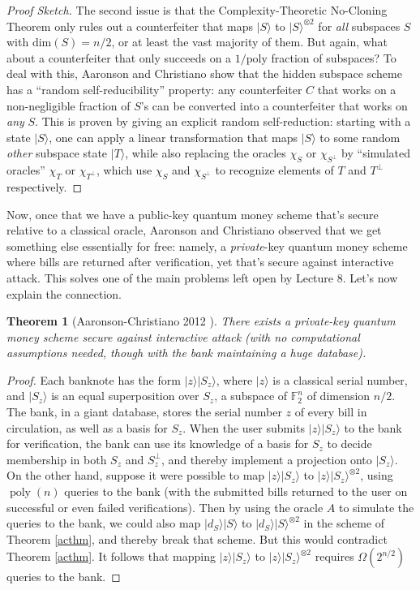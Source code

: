 \documentclass[12pt]{report}
\theoremstyle{plain}
\newtheorem{theorem}{Theorem}[section]
\theoremstyle{definition}
\newcommand{\poly}{\operatorname{poly}}
\renewcommand{\ket}[1]{|#1\rangle}
\begin{document}
\begin{proof}[Proof Sketch]
The second issue is that the Complexity-Theoretic No-Cloning Theorem only rules out a counterfeiter that maps $\ket{S}$ to $\ket{S}^{\otimes 2}$ for {\em all} subspaces $S$ with $\text{dim}(S) = n/2$, or at least the vast majority of them.  But again, what about a counterfeiter that only succeeds on a $1/\text{poly}$ fraction of subspaces?  To deal with this, Aaronson and Christiano show that the hidden subspace scheme has a ``random self-reducibility'' property: any counterfeiter $C$ that works on a non-negligible fraction of $S$'s can be converted into a counterfeiter that works on {\em any} $S$.  This is proven by giving an explicit random self-reduction: starting with a state $\ket{S}$, one can apply a linear transformation that maps $\ket{S}$ to some random {\em other} subspace state $\ket{T}$, while also replacing the oracles $\chi_S$ or $\chi_{S^\perp}$ by ``simulated oracles'' $\chi_T$ or $\chi_{T^\perp}$, which use $\chi_S$ and $\chi_{S^\perp}$ to recognize elements of $T$ and $T^{\perp}$ respectively.
\end{proof}

Now, once that we have a public-key quantum money scheme that's secure relative to a classical oracle, Aaronson and Christiano \cite{achristiano} observed that we get something else essentially for free: namely, a {\em private}-key quantum money scheme where bills are returned after verification, yet that's secure against interactive attack.  This solves one of the main problems left open by Lecture 8.  Let's now explain the connection.

\begin{theorem}[Aaronson-Christiano 2012 \cite{achristiano}]
There exists a private-key quantum money scheme secure against interactive attack (with no computational assumptions needed, though with the bank maintaining a huge database).
\end{theorem}
\begin{proof}
Each banknote has the form $\ket{z}\ket{S_z}$, where $\ket{z}$ is a classical serial number, and $\ket{S_z}$ is an equal superposition over $S_z$, a subspace of $\mathbb{F}_2^n$ of dimension $n/2$.  The bank, in a giant database, stores the serial number $z$ of every bill in circulation, as well as a basis for $S_z$.  When the user submits $\ket{z}\ket{S_z}$ to the bank for verification, the bank can use its knowledge of a basis for $S_z$ to decide membership in both $S_z$ and $S_z^\perp$, and thereby implement a projection onto $\ket{S_z}$.  On the other hand, suppose it were possible to map $\ket{z}\ket{S_z}$ to $\ket{z}\ket{S_z}^{\otimes 2}$, using $\poly(n)$ queries to the bank (with the submitted bills returned to the user on successful or even failed verifications).  Then by using the oracle $A$ to simulate the queries to the bank, we could also map $\ket{d_S}\ket{S}$ to $\ket{d_S}\ket{S}^{\otimes 2}$ in the scheme of Theorem \ref{acthm}, and thereby break that scheme.  But this would contradict Theorem \ref{acthm}.  It follows that mapping $\ket{z}\ket{S_z}$ to $\ket{z}\ket{S_z}^{\otimes 2}$ requires $\Omega(2^{n/2})$ queries to the bank.
\end{proof}
\end{document}
